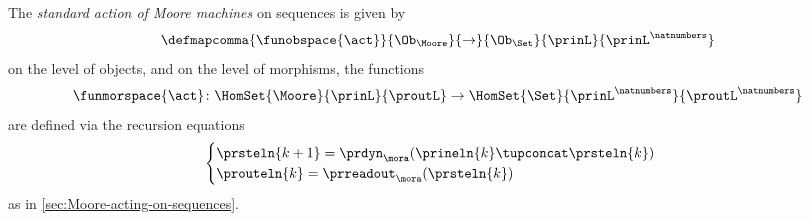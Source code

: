 \begin{definition}
    \label{def:moore-standard-action-on-sequences}
    The \emph{standard action of Moore machines} on sequences is given by
    \begin{equation}
        \defmapcomma{\funobspace{\act}}
        {\Ob_{\Moore}}
        {\to}
        {\Ob_{\Set}}
        {\prinL}
        {\prinL^\natnumbers}
    \end{equation}
    on the level of objects, and on the level of morphisms, the functions
    \begin{equation}
        \funmorspace{\act} \colon  \HomSet{\Moore}{\prinL}{\proutL} \to \HomSet{\Set}{\prinL^\natnumbers}{\proutL^\natnumbers}
    \end{equation}
    are defined via the recursion equations
    \begin{equation}
        \begin{cases}
            \prsteln{k+1} = \prdyn_\mora(\prineln{k} \tupconcat \prsteln{k}) \\
            \prouteln{k}   = \prreadout_\mora(\prsteln{k})
        \end{cases}
    \end{equation}
    as in \cref{sec:Moore-acting-on-sequences}.
\end{definition}

